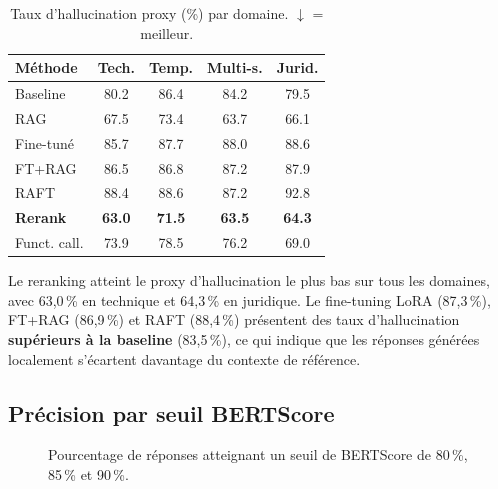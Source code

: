 \documentclass[10pt,journal,compsoc]{IEEEtran}
\newcommand{\best}[1]{\textbf{\textcolor{best}{#1}}}   %
\newcommand{\worst}[1]{\textcolor{worst}{#1}}           %
\begin{document}
\begin{table}[h]
  \centering
  \caption{Taux d'hallucination proxy (\%) par domaine. $\downarrow$ = meilleur.}
  \label{tab:hallucination}
  \renewcommand{\arraystretch}{1.2}
  \begin{tabular}{lcccc}
    \toprule
    \textbf{Méthode} & \textbf{Tech.} & \textbf{Temp.}
      & \textbf{Multi-s.} & \textbf{Jurid.} \\
    \midrule
    Baseline    & 80.2 & 86.4 & 84.2 & 79.5 \\
    RAG         & 67.5 & 73.4 & 63.7 & 66.1 \\
    Fine-tuné   & 85.7 & 87.7 & 88.0 & 88.6 \\
    FT+RAG      & 86.5 & 86.8 & 87.2 & 87.9 \\
    RAFT        & 88.4 & 88.6 & 87.2 & \worst{92.8} \\
    \textbf{Rerank}
                & \best{63.0} & \best{71.5}
                & \best{63.5} & \best{64.3} \\
    Funct. call.& 73.9 & 78.5 & 76.2 & 69.0 \\
    \bottomrule
  \end{tabular}
\end{table}

Le reranking atteint le proxy d'hallucination le plus bas sur tous les
domaines, avec 63,0\,\% en technique et 64,3\,\% en juridique. Le
fine-tuning LoRA (87,3\,\%), FT+RAG (86,9\,\%) et RAFT (88,4\,\%)
présentent des taux d'hallucination \textbf{supérieurs à la baseline}
(83,5\,\%), ce qui indique que les réponses générées localement
s'écartent davantage du contexte de référence.

\subsection{Précision par seuil BERTScore}

\begin{figure}[H]
  \centering
  \caption{Pourcentage de réponses atteignant un seuil de BERTScore
           de 80\,\%, 85\,\% et 90\,\%.}
  \label{fig:acc_bs}
\end{figure}
\end{document}
